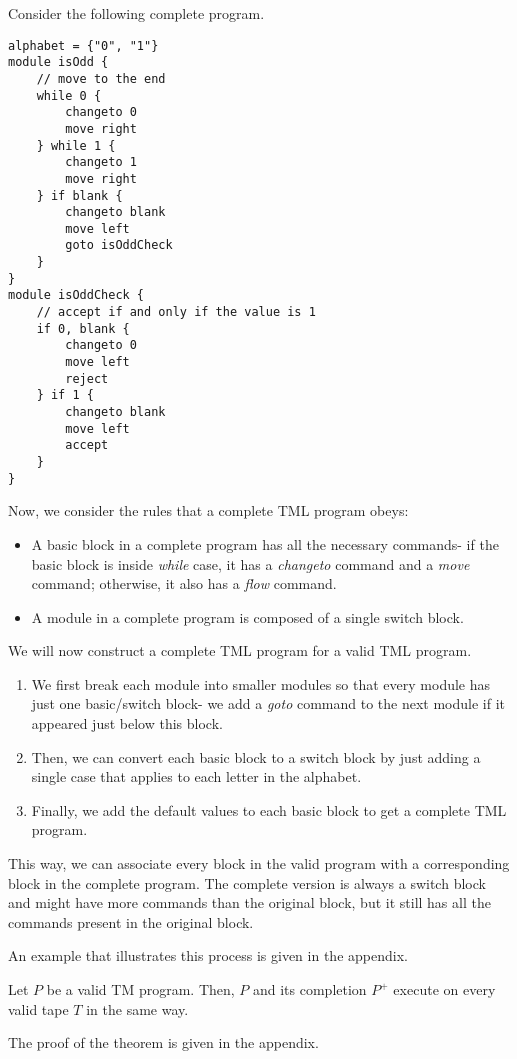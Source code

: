 Consider the following complete program.
\begin{lstlisting}[language=TML]
alphabet = {"0", "1"}
module isOdd {
    // move to the end
    while 0 {
        changeto 0
        move right
    } while 1 {
        changeto 1
        move right
    } if blank {
        changeto blank
        move left
        goto isOddCheck
    }
}
module isOddCheck {
    // accept if and only if the value is 1
    if 0, blank {
        changeto 0
        move left
        reject
    } if 1 {
        changeto blank
        move left
        accept
    }
}
\end{lstlisting}
Now, we consider the rules that a complete TML program obeys:
\begin{itemize}
    \item A basic block in a complete program has all the necessary commands- if the basic block is inside \textit{while} case, it has a \textit{changeto} command and a \textit{move} command; otherwise, it also has a \textit{flow} command.
    \item A module in a complete program is composed of a single switch block.
\end{itemize}

We will now construct a complete TML program for a valid TML program.
\begin{enumerate}
    \item We first break each module into smaller modules so that every module has just one basic/switch block- we add a \textit{goto} command to the next module if it appeared just below this block.
    \item Then, we can convert each basic block to a switch block by just adding a single case that applies to each letter in the alphabet.
    \item Finally, we add the default values to each basic block to get a complete TML program.
\end{enumerate}
This way, we can associate every block in the valid program with a corresponding block in the complete program. The complete version is always a switch block and might have more commands than the original block, but it still has all the commands present in the original block. 

An example that illustrates this process is given in the appendix.

\begin{theorem}
    Let $P$ be a valid TM program. Then, $P$ and its completion $P^+$ execute on every valid tape $T$ in the same way.
\end{theorem}
The proof of the theorem is given in the appendix.

